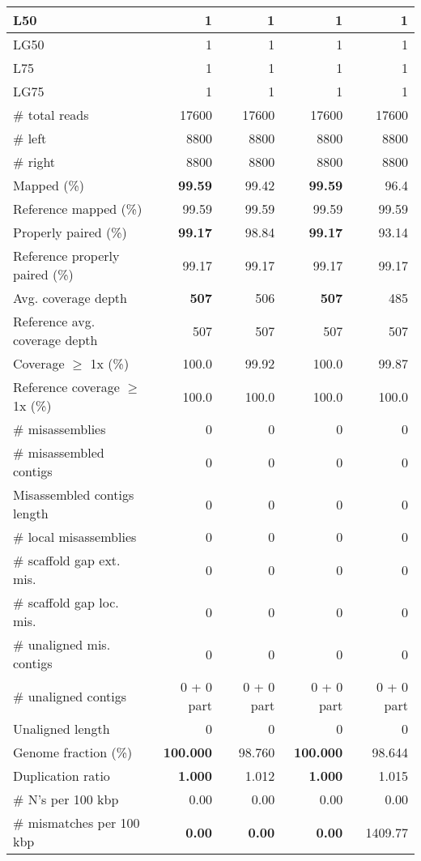 \documentclass[12pt,a4paper]{article}
\begin{document}
\begin{table}[ht]
\begin{center}
\begin{tabular}{|l*{4}{|r}|}
L50 & 1 & 1 & 1 & 1 \\ \hline
LG50 & 1 & 1 & 1 & 1 \\ \hline
L75 & 1 & 1 & 1 & 1 \\ \hline
LG75 & 1 & 1 & 1 & 1 \\ \hline
\# total reads & 17600 & 17600 & 17600 & 17600 \\ \hline
\# left & 8800 & 8800 & 8800 & 8800 \\ \hline
\# right & 8800 & 8800 & 8800 & 8800 \\ \hline
Mapped (\%) & {\bf 99.59} & 99.42 & {\bf 99.59} & 96.4 \\ \hline
Reference mapped (\%) & 99.59 & 99.59 & 99.59 & 99.59 \\ \hline
Properly paired (\%) & {\bf 99.17} & 98.84 & {\bf 99.17} & 93.14 \\ \hline
Reference properly paired (\%) & 99.17 & 99.17 & 99.17 & 99.17 \\ \hline
Avg. coverage depth & {\bf 507} & 506 & {\bf 507} & 485 \\ \hline
Reference avg. coverage depth & 507 & 507 & 507 & 507 \\ \hline
Coverage $\geq$ 1x (\%) & 100.0 & 99.92 & 100.0 & 99.87 \\ \hline
Reference coverage $\geq$ 1x (\%) & 100.0 & 100.0 & 100.0 & 100.0 \\ \hline
\# misassemblies & 0 & 0 & 0 & 0 \\ \hline
\# misassembled contigs & 0 & 0 & 0 & 0 \\ \hline
Misassembled contigs length & 0 & 0 & 0 & 0 \\ \hline
\# local misassemblies & 0 & 0 & 0 & 0 \\ \hline
\# scaffold gap ext. mis. & 0 & 0 & 0 & 0 \\ \hline
\# scaffold gap loc. mis. & 0 & 0 & 0 & 0 \\ \hline
\# unaligned mis. contigs & 0 & 0 & 0 & 0 \\ \hline
\# unaligned contigs & 0 + 0 part & 0 + 0 part & 0 + 0 part & 0 + 0 part \\ \hline
Unaligned length & 0 & 0 & 0 & 0 \\ \hline
Genome fraction (\%) & {\bf 100.000} & 98.760 & {\bf 100.000} & 98.644 \\ \hline
Duplication ratio & {\bf 1.000} & 1.012 & {\bf 1.000} & 1.015 \\ \hline
\# N's per 100 kbp & 0.00 & 0.00 & 0.00 & 0.00 \\ \hline
\# mismatches per 100 kbp & {\bf 0.00} & {\bf 0.00} & {\bf 0.00} & 1409.77 \\ \hline

\end{tabular}
\end{center}
\end{table}
\end{document}
